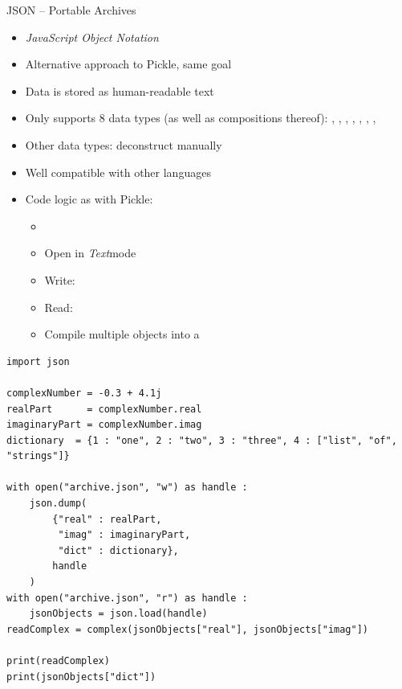 \begin{frame}[fragile]{JSON -- Portable Archives}
%
\begin{itemize}
\item \emph{JavaScript Object Notation}
\item Alternative approach to Pickle, same goal
\item Data is stored as human-readable text
\item Only supports 8 data types (as well as compositions thereof): 
	, , , , , , , 
\item Other data types: deconstruct manually
\item Well compatible with other languages
\item Code logic as with Pickle:
	\begin{itemize}
	\item {}
	\item Open in \emph{Text}mode
	\item Write: 
	\item Read: 
	\item Compile multiple objects into a 
	\end{itemize}
\end{itemize}
%
\end{frame}


\begin{frame}[fragile]
%
\vspace{-3pt}
\begin{codebox}
\begin{verbatim}
import json

complexNumber = -0.3 + 4.1j
realPart      = complexNumber.real
imaginaryPart = complexNumber.imag
dictionary  = {1 : "one", 2 : "two", 3 : "three", 4 : ["list", "of", "strings"]}

with open("archive.json", "w") as handle :
    json.dump(
        {"real" : realPart,
         "imag" : imaginaryPart,
         "dict" : dictionary},
        handle
    )
with open("archive.json", "r") as handle :
    jsonObjects = json.load(handle)
readComplex = complex(jsonObjects["real"], jsonObjects["imag"])

print(readComplex)
print(jsonObjects["dict"])
\end{verbatim}
\end{codebox}
%
\end{frame}

